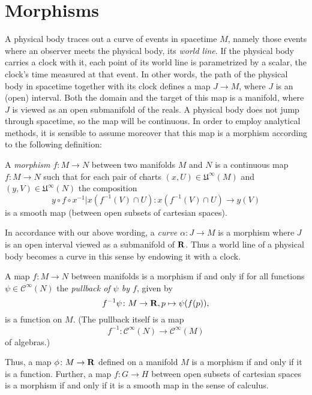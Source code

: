 \section{Morphisms}
\label{sec:morphisms}

A physical body traces out a curve of events in spacetime $M$, namely those events
where an observer meets the physical body, its \emph{world line}. If the physical
body carries a clock with it, each point of its world line is parametrized by
a scalar, the clock's time measured at that event. In other words, the path of
the physical body in spacetime together with its clock defines a map $J \to M$, 
where $J$ is an (open) interval. Both the domain and the target of this map is a 
manifold, where $J$ is viewed as an open submanifold of the reals. A physical
body does not jump through spacetime, so the map will be continuous.
In order to employ analytical methods, it is sensible to assume moreover that
this map is a morphism according to the following definition:

\begin{dfn}
  A \emph{morphism $f\colon M \to N$} between two manifolds $M$ and $N$ is a
  continuous map $f\colon M \to N$ such that for each pair of charts
  $(x, U) \in \mathfrak U^\infty(M)$ and $(y, V) \in \mathfrak U^\infty(N)$ the
  composition
  \[
    y \circ f \circ x^{-1}|x(f^{-1}(V) \cap U)\colon x(f^{-1}(V) \cap U) \to y(V) 
  \]
  is a smooth map (between open subsets of cartesian spaces).
\end{dfn}

In accordance with our above wording, a \emph{curve $\alpha\colon J \to M$} is a
morphism where $J$ is an open interval viewed as a submanifold of $\mathbf{R}$. Thus
a world line of a physical body becomes a curve in this sense
by endowing it with a clock.

A map $f\colon M \to N$ between manifolds is a morphism if and only if
for all functions $\psi \in \mathcal C^\infty(N)$ the \emph{pullback of $\psi$
by $f$}, given by
\begin{equation}
  f^{-1}\psi\colon M \to \mathbf{R}, p \mapsto \psi(f(p)),
\end{equation}
is a function on $M$. (The pullback itself is a map
\begin{equation}
  f^{-1}\colon \mathcal C^\infty(N) \to \mathcal C^\infty(M)
\end{equation}
of algebras.)

Thus, a map $\phi\colon M \to \mathbf{R}$ defined on a manifold $M$ is a
morphism if and only if it is a function. Further, a map $f\colon G \to H$ between
open subsets of cartesian spaces is a morphism if and only if it is a smooth
map in the sense of calculus.

